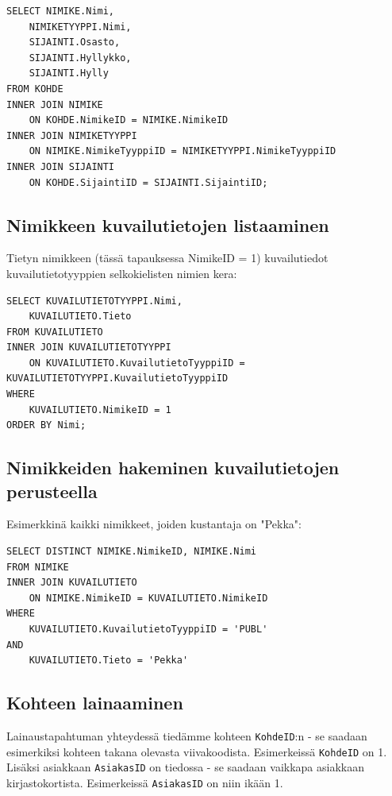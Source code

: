 \documentclass{article}
\begin{document}
\begin{lstlisting}
SELECT NIMIKE.Nimi,
    NIMIKETYYPPI.Nimi,
    SIJAINTI.Osasto,
    SIJAINTI.Hyllykko,
    SIJAINTI.Hylly
FROM KOHDE
INNER JOIN NIMIKE
    ON KOHDE.NimikeID = NIMIKE.NimikeID
INNER JOIN NIMIKETYYPPI
    ON NIMIKE.NimikeTyyppiID = NIMIKETYYPPI.NimikeTyyppiID
INNER JOIN SIJAINTI
    ON KOHDE.SijaintiID = SIJAINTI.SijaintiID;
\end{lstlisting}

\subsection{Nimikkeen kuvailutietojen listaaminen}

Tietyn nimikkeen (tässä tapauksessa NimikeID = 1) kuvailutiedot kuvailutietotyyppien selkokielisten nimien kera:

\begin{lstlisting}
SELECT KUVAILUTIETOTYYPPI.Nimi,
    KUVAILUTIETO.Tieto 
FROM KUVAILUTIETO
INNER JOIN KUVAILUTIETOTYYPPI
    ON KUVAILUTIETO.KuvailutietoTyyppiID = KUVAILUTIETOTYYPPI.KuvailutietoTyyppiID
WHERE
    KUVAILUTIETO.NimikeID = 1
ORDER BY Nimi;
\end{lstlisting}

\subsection{Nimikkeiden hakeminen kuvailutietojen perusteella}

Esimerkkinä kaikki nimikkeet, joiden kustantaja on "Pekka":

\begin{lstlisting}
SELECT DISTINCT NIMIKE.NimikeID, NIMIKE.Nimi
FROM NIMIKE
INNER JOIN KUVAILUTIETO
    ON NIMIKE.NimikeID = KUVAILUTIETO.NimikeID
WHERE
    KUVAILUTIETO.KuvailutietoTyyppiID = 'PUBL'
AND
    KUVAILUTIETO.Tieto = 'Pekka'
\end{lstlisting}

\subsection{Kohteen lainaaminen}

Lainaustapahtuman yhteydessä tiedämme kohteen \texttt{KohdeID}:n - se saadaan esimerkiksi kohteen takana olevasta viivakoodista. Esimerkeissä \texttt{KohdeID} on 1. Lisäksi asiakkaan \texttt{AsiakasID} on tiedossa - se saadaan vaikkapa asiakkaan kirjastokortista. Esimerkeissä \texttt{AsiakasID} on niin ikään 1.
\end{document}
